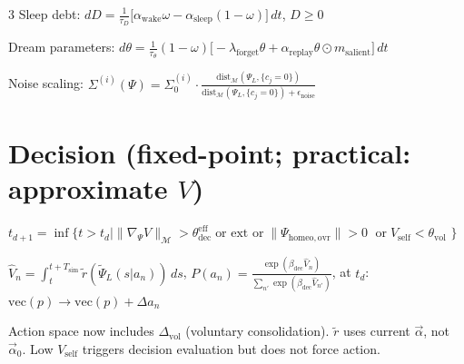 \documentclass[8pt,landscape]{extarticle}
\newcommand{\fix}[1]{\textcolor{fixcolor}{#1}}
\newcommand{\vfive}[1]{\textcolor{v15color}{#1}}
\begin{document}
\begin{multicols}{3}
\fix{Sleep debt:}
$dD = \frac{1}{\tau_D}\bigl[\alpha_{\mathrm{wake}}\omega - \alpha_{\mathrm{sleep}}(1-\omega)\bigr]\,dt$, \quad \fix{$D \ge 0$}

Dream parameters:
$d\theta = \frac{1}{\tau_\theta}(1-\omega)\bigl[-\lambda_{\mathrm{forget}}\theta + \alpha_{\mathrm{replay}}\theta \odot m_{\mathrm{salient}}\bigr]\,dt$

Noise scaling:
$\Sigma^{(i)}(\Psi) = \Sigma^{(i)}_0 \cdot \frac{\mathrm{dist}_{\mathcal{M}}(\Psi_L, \{c_j = 0\})}{\mathrm{dist}_{\mathcal{M}}(\Psi_L, \{c_j = 0\}) + \epsilon_{\mathrm{noise}}}$

\section*{Decision (fixed-point; practical: approximate $V$)}

$t_{d+1} = \inf\bigl\{t > t_d \mid \|\nabla_\Psi V\|_{\mathcal{M}} > \theta^{\mathrm{eff}}_{\mathrm{dec}} \;\text{or ext or}\; \|\Psi_{\mathrm{homeo,ovr}}\| > 0$ \vfive{$\;\text{or}\; V_{\mathrm{self}} < \theta_{\mathrm{vol}}$} $\bigr\}$

$\hat{V}_n = \int_{t}^{t+T_{\mathrm{sim}}} \tilde r(\tilde\Psi_L(s|a_n))\,ds$, \quad $P(a_n) = \frac{\exp(\beta_{\mathrm{dec}}\hat{V}_n)}{\sum_{n'}\exp(\beta_{\mathrm{dec}}\hat{V}_{n'})}$, \quad at $t_d$: $\mathrm{vec}(p) \to \mathrm{vec}(p) + \Delta a_n$

\vfive{Action space now includes $\Delta_{\mathrm{vol}}$ (voluntary consolidation). $\tilde r$ uses current $\vec\alpha$, not $\vec\alpha_0$. Low $V_{\mathrm{self}}$ triggers decision evaluation but does not force action.}


\end{multicols}
\end{document}
